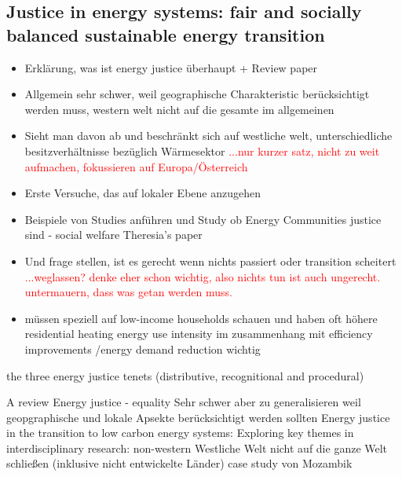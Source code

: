 \subsection{Justice in energy systems: fair and socially balanced sustainable energy transition}\label{aspect2}
\begin{itemize}
	\item[\textcolor{col}{\textbullet}] \textcolor{col}{Erklärung, was ist energy justice überhaupt + Review paper}
	\item[\textcolor{col}{\textbullet}] \textcolor{col}{Allgemein sehr schwer, weil geographische Charakteristic berücksichtigt werden muss, western welt nicht auf die gesamte im allgemeinen}
	\item[\textcolor{col}{\textbullet}] \textcolor{col}{Sieht man davon ab und beschränkt sich auf westliche welt, unterschiedliche besitzverhältnisse bezüglich Wärmesektor} \textcolor{red}{...nur kurzer satz, nicht zu weit aufmachen, fokussieren auf Europa/Österreich}
	\item[\textcolor{col}{\textbullet}] \textcolor{col}{Erste Versuche, das auf lokaler Ebene anzugehen}
	\item[\textcolor{col}{\textbullet}] \textcolor{col}{Beispiele von Studies anführen und Study ob Energy Communities justice sind - social welfare Theresia's paper}
	\item[\textcolor{col}{\textbullet}] \textcolor{col}{Und frage stellen, ist es gerecht wenn nichts passiert oder transition scheitert} \textcolor{red}{...weglassen? denke eher schon wichtig, also nichts tun ist auch ungerecht. untermauern, dass was getan werden muss.}
	\item[\textcolor{col}{\textbullet}] \textcolor{col}{müssen speziell auf low-income households schauen und haben oft höhere residential heating energy use intensity im zusammenhang mit efficiency improvements /energy demand reduction wichtig}
\end{itemize}


the three energy justice tenets (distributive, recognitional and procedural)


A review Energy justice - equality \cite{pellegrini2020energy}
Sehr schwer aber zu generalisieren weil geopgraphische und lokale Apsekte berücksichtigt werden sollten
Energy justice in the transition to low carbon energy systems: Exploring key themes in interdisciplinary research: non-western 
Westliche Welt nicht auf die ganze Welt schließen (inklusive nicht entwickelte Länder) \cite{broto2018energy} case study von Mozambik

